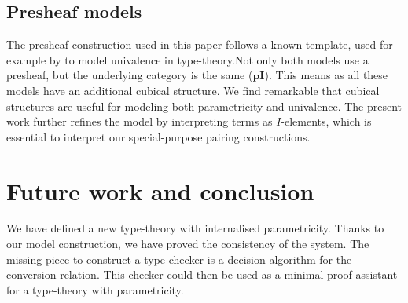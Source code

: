 \documentclass[english]{PaperTools/latex/lipics}
\def\pI{\ensuremath{\mathbf{pI}}}
\begin{document}
\subsection{Presheaf models}

The presheaf construction used in this paper follows a known template,
used for example by \citet{bezem2014model,DBLP:journals/corr/Pitts14}
to model univalence in type-theory.Not only both models use a
presheaf, but the underlying category is the same ($\pI$). This means
as all these models have an additional cubical structure.  We find
remarkable that cubical structures are useful for modeling both
parametricity and univalence. The present work further refines the
model by interpreting terms as $I$-elements, which is essential to
interpret our special-purpose pairing constructions.

\section{Future work and conclusion}
We have defined a new type-theory with internalised parametricity.
Thanks to our model construction, we have proved the consistency of
the system. The missing piece to construct a type-checker is a
decision algorithm for the conversion relation.  This checker could
then be used as a minimal proof assistant for a type-theory with
parametricity.



\end{document}
